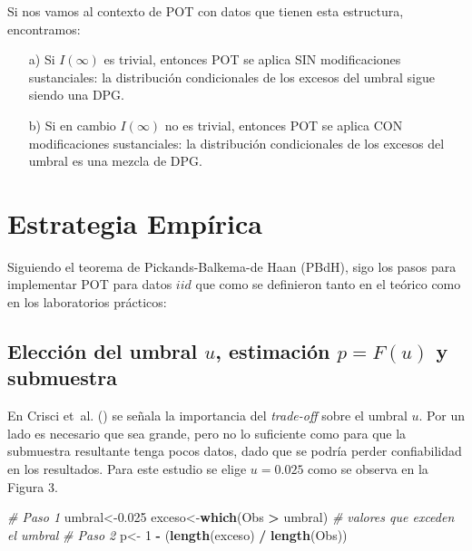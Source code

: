 \documentclass[
  12pt]{article}
\newenvironment{Shaded}{\begin{snugshade}}{\end{snugshade}}
\newcommand{\CommentTok}[1]{\textcolor[rgb]{0.56,0.35,0.01}{\textit{#1}}}
\newcommand{\DecValTok}[1]{\textcolor[rgb]{0.00,0.00,0.81}{#1}}
\newcommand{\FloatTok}[1]{\textcolor[rgb]{0.00,0.00,0.81}{#1}}
\newcommand{\FunctionTok}[1]{\textcolor[rgb]{0.13,0.29,0.53}{\textbf{#1}}}
\newcommand{\NormalTok}[1]{#1}
\newcommand{\OtherTok}[1]{\textcolor[rgb]{0.56,0.35,0.01}{#1}}
\newcommand{\SpecialCharTok}[1]{\textcolor[rgb]{0.81,0.36,0.00}{\textbf{#1}}}
\begin{document}
Si nos vamos al contexto de POT con datos que tienen esta estructura,
encontramos:

\begin{itemize}
\item[a)] Si $I(\infty)$ es trivial, entonces POT se aplica SIN modificaciones sustanciales: la distribución condicionales de los excesos del umbral sigue siendo una DPG.
\item[b)] Si en cambio $I(\infty)$ no es trivial, entonces POT se aplica CON modificaciones sustanciales: la distribución condicionales de los excesos del umbral es una mezcla de DPG.
\end{itemize}

\newpage

\section{Estrategia Empírica}\label{estrategia-empuxedrica}

Siguiendo el teorema de Pickands-Balkema-de Haan (PBdH), sigo los pasos
para implementar POT para datos \(iid\) que como se definieron tanto en
el teórico como en los laboratorios prácticos:

\subsection{\texorpdfstring{Elección del umbral \(u\), estimación
\(p=F(u)\) y
submuestra}{Elección del umbral u, estimación p=F(u) y submuestra}}\label{elecciuxf3n-del-umbral-u-estimaciuxf3n-pfu-y-submuestra}

En Crisci et~al. () se señala la
importancia del \textit{trade-off} sobre el umbral \(u\). Por un lado es
necesario que sea grande, pero no lo suficiente como para que la
submuestra resultante tenga pocos datos, dado que se podría perder
confiabilidad en los resultados. Para este estudio se elige \(u=0.025\)
como se observa en la Figura 3.

\begin{Shaded}
\begin{Highlighting}[]
\CommentTok{\# Paso 1}
\NormalTok{umbral}\OtherTok{\textless{}{-}}\FloatTok{0.025}
\NormalTok{exceso}\OtherTok{\textless{}{-}}\FunctionTok{which}\NormalTok{(Obs }\SpecialCharTok{\textgreater{}}\NormalTok{ umbral) }\CommentTok{\#  valores que exceden el umbral}
\CommentTok{\# Paso 2}
\NormalTok{p}\OtherTok{\textless{}{-}} \DecValTok{1} \SpecialCharTok{{-}}\NormalTok{ (}\FunctionTok{length}\NormalTok{(exceso) }\SpecialCharTok{/} \FunctionTok{length}\NormalTok{(Obs)) }
\end{Highlighting}
\end{Shaded}
\end{document}

